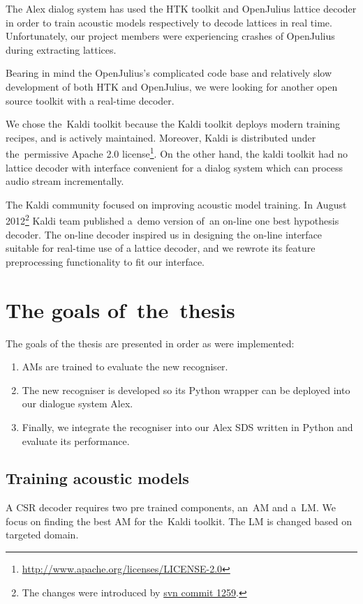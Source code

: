 The Alex dialog system has used the \ac{HTK} toolkit\cite{young94htk} and OpenJulius\cite{lee2009julius} lattice decoder in order to train acoustic models respectively to decode lattices in real time. 
Unfortunately, our project members were experiencing crashes of OpenJulius during extracting lattices.

Bearing in mind the OpenJulius's complicated code base and relatively slow development of both \ac{HTK} and OpenJulius, we were looking for another open source toolkit with a real-time decoder.

We chose the~Kaldi toolkit because the Kaldi toolkit deploys modern training recipes, and is actively maintained. 
Moreover, Kaldi is distributed under the~permissive Apache 2.0 license\footnote{\url{http://www.apache.org/licenses/LICENSE-2.0}}.
On the other hand, the kaldi toolkit had no lattice decoder with interface convenient for a dialog system which can process audio stream incrementally.

The Kaldi community focused on improving acoustic model training. 
In August 2012\footnote{The changes were introduced by \href{https://sourceforge.net/p/kaldi/code/1259/}{svn commit 1259}.} Kaldi team published a~demo version of~an on-line one best hypothesis decoder.
The on-line decoder inspired us in designing the on-line interface suitable for real-time use of a lattice decoder, and we rewrote its feature preprocessing functionality to fit our interface.

\section{The goals of~the~thesis} 
\label{sec:goals}
The goals of the thesis are presented in order as were implemented:
\begin{enumerate}
    \item \acp{AM} are trained to evaluate the new recogniser.
    \item The new recogniser is developed so its Python wrapper can be deployed into our dialogue system Alex.
    \item Finally, we integrate the recogniser into our Alex \ac{SDS} written in Python and evaluate its performance.
\end{enumerate}

\subsection{Training acoustic models} 
\label{sub:training_kaldi_acoustic_models}
A \acl{CSR} decoder requires two pre trained components, an~\acl{AM} and a~\acl{LM}. 
We focus on finding the best \acl{AM} for the~Kaldi toolkit. 
The \acl{LM} is changed based on targeted domain.


